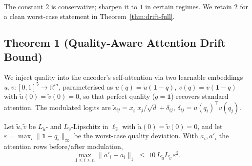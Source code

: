 \begin{remark}
The constant $2$ is conservative; \citet{gao2017properties} sharpen it to $1$ in certain regimes. We
retain $2$ for a clean worst-case statement in Theorem~\ref{thm:drift-full}.
\end{remark}

\subsection{Theorem 1 (Quality-Aware Attention Drift Bound)}\label{app:a1-thm1}

We inject quality into the encoder's self-attention via two learnable embeddings
$u,v:[0,1]^5\to\mathbb{R}^m$, parameterised as $u(q)=\tilde{u}(\mathbf{1}-q)$,
$v(q)=\tilde{v}(\mathbf{1}-q)$ with $\tilde{u}(0)=\tilde{v}(0)=0$, so that perfect quality
($q=\mathbf{1}$) recovers standard attention. The modulated logits are
$\tilde{s}_{ij}=x_i^\top x_j/\sqrt{d}+\delta_{ij}$, $\delta_{ij}=u(q_i)^\top v(q_j)$.

\begin{theorem}\label{thm:drift-full}\label{thm:drift}
Let $\tilde{u},\tilde{v}$ be $L_{\tilde{u}}$- and $L_{\tilde{v}}$-Lipschitz in $\ell_2$ with
$\tilde{u}(0)=\tilde{v}(0)=0$, and let $\varepsilon=\max_i\|\mathbf{1}-q_i\|_\infty$ be the
worst-case quality deviation. With $a_i,a'_i$ the attention rows before/after modulation,
\begin{equation}
\max_{1\leq i\leq n}\|a'_i-a_i\|_1 \;\leq\; 10\,L_{\tilde{u}}L_{\tilde{v}}\,\varepsilon^2.
\label{eq:a1-drift}
\end{equation}
\end{theorem}

